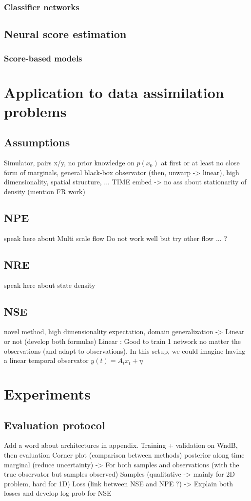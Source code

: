 \documentclass[a4paper, 12pt]{article}
\begin{document}
\subsubsection{Classifier networks}
\subsection{Neural score estimation}
\subsubsection{Score-based models}

\section{Application to data assimilation problems}
\subsection{Assumptions}
Simulator, pairs x/y, no prior knowledge on $p(x_0)$ at first or at least no close form of marginals,
general black-box observator (then, unwarp -> linear), high dimensionality,
spatial structure, ... TIME embed -> no ass about stationarity of density (mention FR work)

\subsection{NPE}
speak here about Multi scale flow
Do not work well but try other flow ... ?
\subsection{NRE}
speak here about state density 
\subsection{NSE}
novel method, high dimensionality expectation, domain generalization
-> Linear or not (develop both formulae)
Linear : Good to train 1 network no matter the observations (and adapt to observations). In this 
setup, we could imagine having a linear temporal observator $y(t) = A_t x_t + \eta$
\section{Experiments}
\subsection{Evaluation protocol}
Add a word about architectures in appendix.
Training + validation on WndB, then evaluation 
Corner plot (comparison between methods) posterior along time marginal (reduce uncertainty)
-> For both samples and observations (with the true observator but samples observed)
Samples (qualitative -> mainly for 2D problem, hard for 1D)
Loss (link between NSE and NPE ?) -> Explain both losses and develop log prob for NSE 
\end{document}
